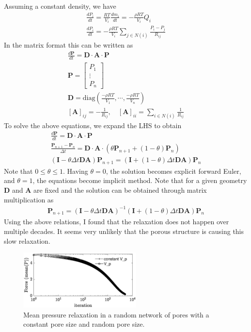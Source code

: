 %
Assuming a constant density, we have
%
\begin{align}
    \frac{d P_i}{dt} = \frac{RT}{V_i} \frac{d m_i}{dt}  = -\frac{\rho RT}{V_i} Q_i \\
    \frac{d P_i}{dt} = - \frac{\rho RT}{V_i} \sum_{j \in N(i)} \frac{P_i - P_j}{R_{ij}}  
\end{align}
%
In the matrix format this can be written as 
%
\begin{align}
\frac{d\mathbf{P}}{dt} = \mathbf{D} \cdot \mathbf{A} \cdot \mathbf{P}\\
\mathbf{P} = \begin{bmatrix} P_1 \\ \vdots \\ P_n
\end{bmatrix}\\
\mathbf{D} = \text{diag}(\frac{-\rho R T}{V_1},\cdots, \frac{-\rho R T}{V_n})\\
[\mathbf{A}]_{ij} = -\frac{1}{R_{ij}}, \quad [\mathbf{A}]_{ii} = \sum_{i\in N(i)} \frac{1}{R_{ij}}
\end{align}
%
To solve the above equations, we expand the LHS to obtain
%
\begin{align}
    \frac{d\mathbf{P}}{dt} = \mathbf{D} \cdot \mathbf{A} \cdot \mathbf{P} \\
    \frac{\mathbf{P}_{n+1}- \mathbf{P}_n}{\Delta t} = \mathbf{D} \cdot \mathbf{A} \cdot \left( \theta \mathbf{P}_{n+1} + (1-\theta) \mathbf{P}_{n}\right) \\    
    \left( \mathbf{I} - \theta\Delta t \mathbf{D}\mathbf{A} \right) \mathbf{P}_{n+1} = \left( \mathbf{I} + (1-\theta) \Delta t \mathbf{D} \mathbf{A}\right) \mathbf{P}_n
\end{align}
%
Note that $0 \leq \theta \leq 1$. Having $\theta = 0$, the solution becomes explicit forward Euler, and $\theta = 1$, the equations become implicit method. Note that for a given geometry $\mathbf{D}$ and $\mathbf{A}$ are fixed and the solution can be obtained through matrix multiplication as
%
\begin{align}
 \mathbf{P}_{n+1} = \left( \mathbf{I} - \theta\Delta t \mathbf{D}\mathbf{A} \right)^{-1} \left( \mathbf{I} + (1-\theta) \Delta t \mathbf{D} \mathbf{A}\right) \mathbf{P}_n
\end{align}
%
Using the above relations, I found that the relaxation does not happen over multiple decades. It seems very unlikely that the porous structure is causing this slow relaxation. 
\begin{figure}[H]
  \centering
  \includegraphics[width=0.55\textwidth]{./Figs/relaxation-porous.eps}
  \caption{Mean pressure relaxation in a random network of pores with a constant pore size and random pore size.} \label{relaxation}
\end{figure}

